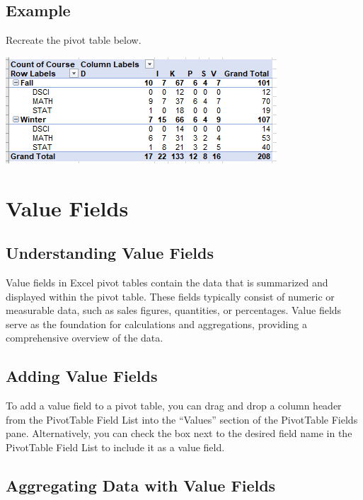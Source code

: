 \documentclass[
]{book}
\begin{document}
\hypertarget{example-1}{%
\subsection{Example}\label{example-1}}

Recreate the pivot table below.

\includegraphics{PT5.png}

\hypertarget{value-fields}{%
\section{Value Fields}\label{value-fields}}

\hypertarget{understanding-value-fields}{%
\subsection{Understanding Value Fields}\label{understanding-value-fields}}

Value fields in Excel pivot tables contain the data that is summarized and displayed within the pivot table. These fields typically consist of numeric or measurable data, such as sales figures, quantities, or percentages. Value fields serve as the foundation for calculations and aggregations, providing a comprehensive overview of the data.

\hypertarget{adding-value-fields}{%
\subsection{Adding Value Fields}\label{adding-value-fields}}

To add a value field to a pivot table, you can drag and drop a column header from the PivotTable Field List into the ``Values'' section of the PivotTable Fields pane. Alternatively, you can check the box next to the desired field name in the PivotTable Field List to include it as a value field.

\hypertarget{aggregating-data-with-value-fields}{%
\subsection{Aggregating Data with Value Fields}\label{aggregating-data-with-value-fields}}
\end{document}

